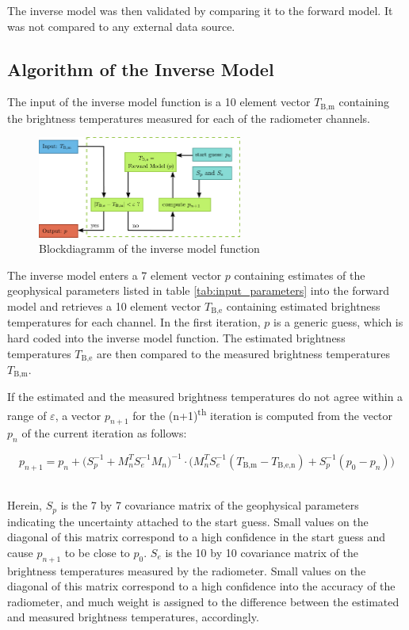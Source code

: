 \documentclass[11pt, a4paper]{article}
\begin{document}
The inverse model was then validated by comparing it to the forward model. It was not compared to any external data source.


\subsection{Algorithm of the Inverse Model}

The input of the inverse model function is a 10 element vector \(T_\text{B,m}\) containing the brightness temperatures measured for each of the radiometer channels.
\newline

\begin{figure}[h]
   \centering
   \includegraphics[width=0.6\textwidth]{blockdiagramm.pdf}
   \caption{Blockdiagramm of the inverse model function}
   \label{fig:block}
\end{figure}


The inverse model enters a 7 element vector \(p\) containing estimates of the geophysical parameters listed in table \ref{tab:input_parameters} into the forward model and retrieves a 10 element vector \(T_\text{B,e}\) containing estimated brightness temperatures for each channel. In the first iteration, \(p\) is a generic guess, which is hard coded into the inverse model function. The estimated brightness temperatures \(T_\text{B,e}\) are then compared to the measured brightness temperatures \(T_\text{B,m}\).
\newline

If the estimated and the measured brightness temperatures do not agree within a range of \(\varepsilon\), a vector \(p_{n+1}\) for the (n+1)\textsuperscript{th} iteration is computed from the vector \(p_n\) of the current iteration as follows:

\begin{equation*}
p_{n+1} =
p_n   +   \Big(S_p^{-1} + M_n^T S_e^{-1} M_n \Big)^{-1}   \cdot   \Big(M_n^T S_e^{-1} (T_\text{B,m} - T_\text{B,e,n}) + S_p^{-1} (p_0 - p_n) \Big)
\end{equation*}

\ \\
Herein, \(S_p\) is the 7 by 7 covariance matrix of the geophysical parameters indicating the uncertainty attached to the start guess. Small values on the diagonal of this matrix correspond to a high confidence in the start guess and cause \(p_{n+1}\) to be close to \(p_0\). \(S_e\) is the 10 by 10 covariance matrix of the brightness temperatures measured by the radiometer. Small values on the diagonal of this matrix correspond to a high confidence into the accuracy of the radiometer, and much weight is assigned to the difference between the estimated and measured brightness temperatures, accordingly.
\newline
\end{document}
